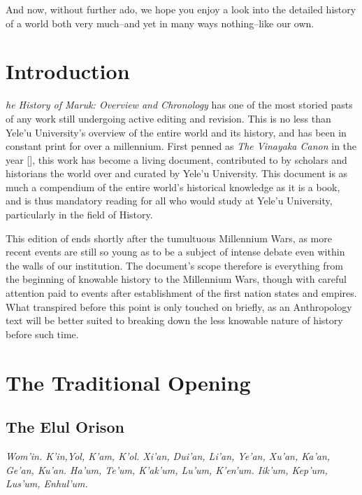 		And now, without further ado, we hope you enjoy a look into the detailed history of a world both very much--and yet in many ways nothing--like our own. \par
		
		\clearpage  
\restoregeometry
\tableofcontents
\newpage
\thispagestyle{plain}
\chapter*{Introduction}
\label{chap:intro}
	\lettrine[findent=2pt]{}{ }\textit{he History of Maruk: Overview and Chronology} has one of the most storied pasts of any work still undergoing active editing and revision. This is no less than Yele'u University's overview of the entire world and its history, and has been in constant print for over a millennium. First penned as \textit{The Vinayaka Canon} in the year [], this work has become a living document, contributed to by scholars and historians the world over and curated by Yele'u University. This document is as much a compendium of the entire world's historical knowledge as it is a book, and is thus mandatory reading for all who would study at Yele'u University, particularly in the field of History.\par 
	This edition of  ends shortly after the tumultuous Millennium Wars, as more recent events are still so young as to be a subject of intense debate even within the walls of our institution. The document's scope therefore is everything from the beginning of knowable history to the Millennium Wars, though with careful attention paid to events after establishment of the first nation states and empires. What transpired before this point is only touched on briefly, as an Anthropology text will be better suited to breaking down the less knowable nature of history before such time.

\chapter*{The Traditional Opening}
\label{chap:tradopen}

\section{The Elul Orison}

\begin{center}\textit{Wom’in. K’in,Yol, K’am, K’ol. Xi’an, Dui’an, Li’an, Ye’an, Xu’an, Ka’an, Ge’an, Ku’an. Ha’um, Te’um, K’ak’um, Lu’um, K’en’um. Iik’um, Kep’um, Lus’um, Enhul’um.}\end{center} 

